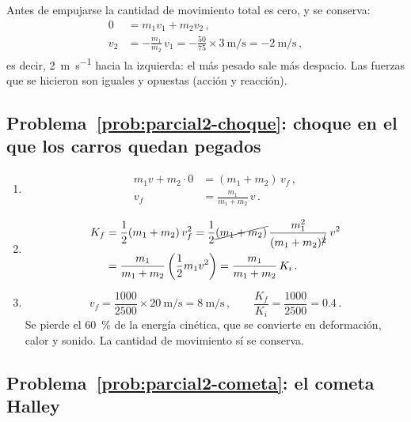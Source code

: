 \documentclass[11pt,a4paper]{book}
\begin{document}
Antes de empujarse la cantidad de movimiento total es cero, y se conserva:
\begin{align}
    0 &= m_1 v_1 + m_2 v_2\,, \nonumber\\
    v_2 &= -\frac{m_1}{m_2}\,v_1 = -\frac{50}{75} \times \SI{3}{\meter\per\second}
         = \SI{-2}{\meter\per\second}\,,
\end{align}
es decir, \SI{2}{\meter\per\second} hacia la izquierda: el más pesado sale más
despacio. Las fuerzas que se hicieron son iguales y opuestas (acción y
reacción).

\subsection*{Problema~\ref{prob:parcial2-choque}: choque en el que los carros quedan pegados}
\label{sol:parcial2-choque}

\begin{enumerate}[label=\alph*)]
    \item
    \begin{align}
        m_1 v + m_2 \cdot 0 &= (m_1 + m_2)\,v_f\,, \nonumber\\
        v_f &= \frac{m_1}{m_1 + m_2}\,v\,.
    \end{align}
    \item
    \begin{align}
        K_f &= \frac{1}{2}(m_1 + m_2)\,v_f^2
             = \frac{1}{2}\cancel{(m_1 + m_2)}\,\frac{m_1^2}{(m_1 + m_2)^{\cancel{2}}}\,v^2 \nonumber\\
            &= \frac{m_1}{m_1 + m_2}\left(\frac{1}{2}m_1 v^2\right)
             = \frac{m_1}{m_1 + m_2}\,K_i\,.
    \end{align}
    \item
    \begin{equation}
        v_f = \frac{1000}{2500} \times \SI{20}{\meter\per\second}
            = \SI{8}{\meter\per\second}\,,
        \qquad
        \frac{K_f}{K_i} = \frac{1000}{2500} = 0.4\,.
    \end{equation}
    Se pierde el \SI{60}{\percent} de la energía cinética, que se convierte en
    deformación, calor y sonido. La cantidad de movimiento sí se conserva.
\end{enumerate}

\subsection*{Problema~\ref{prob:parcial2-cometa}: el cometa Halley}
\label{sol:parcial2-cometa}
\end{document}
